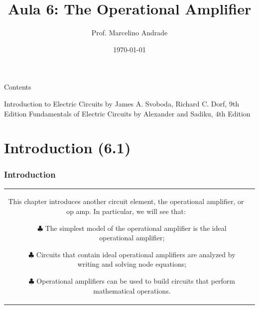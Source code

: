 \documentclass[aspectratio=169]{beamer}
\title[\sc{Teoria de Circuitos Eletrônicos 1}]{\LARGE Aula 6: The Operational Amplifier}
\author[Prof. Marcelino Andrade]{Prof. Marcelino Andrade}
\institute{Faculdade UnB Gama} %
\date{\today}
\begin{document}
\justifying %
\pagebreak

\begin{frame}
  \titlepage
\end{frame}


\begin{frame}{Contents\newline}

\tableofcontents
     		Introduction to Electric Circuits by James A. Svoboda, Richard C. Dorf, 9th Edition 
     		Fundamentals of Electric Circuits by Alexander and Sadiku, 4th Edition	
\end{frame}

\section{Introduction (6.1)}
\begin{frame}[fragile]
	\frametitle{Introduction}
		\begin{tabular}{cc}
			\begin{columns}
				\begin{column}{1\textwidth}  %
					This chapter introduces another circuit element, the operational amplifier, or op amp. In particular, we will see that:	\newline
		
					\begin{itemize}
						\item[$\clubsuit$]{The simplest model of the operational amplifier is the ideal operational amplifier;}
						\item[$\clubsuit$]{Circuits that contain ideal operational amplifiers are analyzed by writing and solving node equations;}	
						\item[$\clubsuit$]{Operational amplifiers can be used to build circuits that perform mathematical operations.}		
					\end{itemize}
					
				\end{column}
			\end{columns}
		
	\end{tabular}
\end{frame}
\end{document}
